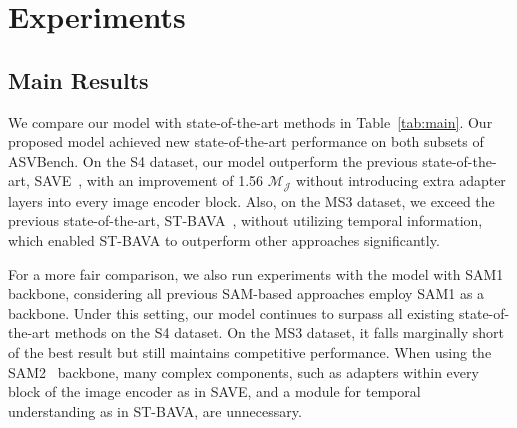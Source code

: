 

\section{Experiments}
\subsection{Main Results}

We compare our model with state-of-the-art methods in Table~\ref{tab:main}. 
Our proposed model achieved new state-of-the-art performance on both subsets of ASVBench. On the S4 dataset, our model outperform the previous state-of-the-art, SAVE~\cite{nguyen2024save}, with an improvement of 1.56 $\mathcal{M}_{\mathcal{J}}$ without introducing extra adapter layers into every image encoder block. Also, on the MS3 dataset, we exceed the previous state-of-the-art, ST-BAVA~\cite{seon2024extending}, without utilizing temporal information, which enabled ST-BAVA to outperform other approaches significantly.

For a more fair comparison, we also run experiments with the model with SAM1\cite{cen20233dsam} backbone, considering all previous SAM-based approaches employ SAM1 as a backbone. Under this setting, our model continues to surpass all existing state-of-the-art methods on the S4 dataset. On the MS3 dataset, it falls marginally short of the best result but still maintains competitive performance.
When using the SAM2~\cite{ravi2024sam2} backbone, many complex components, such as adapters within every block of the image encoder as in SAVE, and a module for temporal understanding as in ST-BAVA, are unnecessary.




